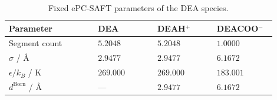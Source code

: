 \begin{table}[htbp]\small\setlength{\tabcolsep}{2pt}\caption{Fixed ePC-SAFT parameters of the DEA species.}\label{tab:p2-dea-fixed-current}
\begin{tabular}{@{}>{\raggedright\arraybackslash}p{0.3\linewidth}>{\raggedright\arraybackslash}p{0.2\linewidth}>{\raggedright\arraybackslash}p{0.2\linewidth}>{\raggedright\arraybackslash}p{0.2\linewidth}@{}}
\toprule Parameter & DEA & DEAH$^+$ & DEACOO$^-$ \\ \midrule
Segment count & $5.2048$ & $5.2048$ & $1.0000$ \\
$\sigma$ / \AA & $2.9477$ & $2.9477$ & $6.1672$ \\
$\epsilon/k_B$ / K & $269.000$ & $269.000$ & $183.001$ \\
$d^{\mathrm{Born}}$ / \AA & --- & $2.9477$ & $6.1672$ \\
\bottomrule\end{tabular}
\par{}\end{table}
